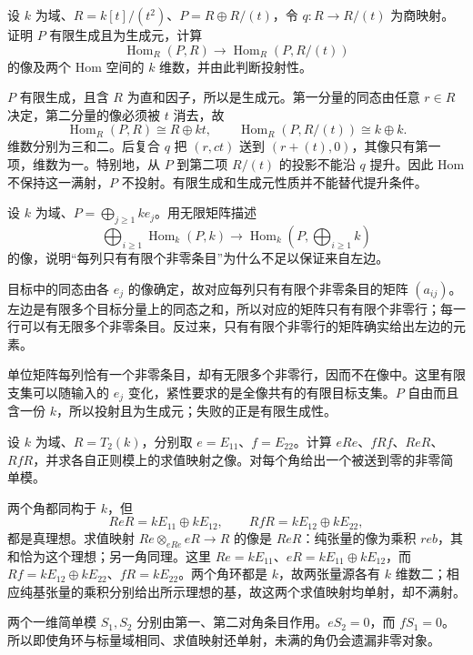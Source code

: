 \begin{exercise}\label{b2:ex:16-generator-not-projective}
	设 \(k\) 为域、\(R=k[t]/(t^2)\)、\(P=R\oplus R/(t)\)，令 \(q:R\to R/(t)\) 为商映射。证明 \(P\) 有限生成且为生成元，计算
	\[
		\operatorname{Hom}_R(P,R)\longrightarrow\operatorname{Hom}_R(P,R/(t))
	\]
	的像及两个 Hom 空间的 \(k\) 维数，并由此判断投射性。
\end{exercise}
\begin{solution}
	\(P\) 有限生成，且含 \(R\) 为直和因子，所以是生成元。第一分量的同态由任意 \(r\in R\) 决定，第二分量的像必须被 \(t\) 消去，故
	\[
		\operatorname{Hom}_R(P,R)\cong R\oplus kt,\qquad \operatorname{Hom}_R(P,R/(t))\cong k\oplus k.
	\]
	维数分别为三和二。后复合 \(q\) 把 \((r,ct)\) 送到 \((r+(t),0)\)，其像只有第一项，维数为一。特别地，从 \(P\) 到第二项 \(R/(t)\) 的投影不能沿 \(q\) 提升。因此 Hom 不保持这一满射，\(P\) 不投射。有限生成和生成元性质并不能替代提升条件。
\end{solution}

\begin{exercise}\label{b2:ex:16-projective-generator-not-compact}
	设 \(k\) 为域、\(P=\bigoplus_{j\ge1}ke_j\)。用无限矩阵描述
	\[
		\bigoplus_{i\ge1}\operatorname{Hom}_k(P,k) \longrightarrow\operatorname{Hom}_k\left(P,\bigoplus_{i\ge1}k\right)
	\]
	的像，说明“每列只有有限个非零条目”为什么不足以保证来自左边。
\end{exercise}
\begin{solution}
	目标中的同态由各 \(e_j\) 的像确定，故对应每列只有有限个非零条目的矩阵 \((a_{ij})\)。左边是有限多个目标分量上的同态之和，所以对应的矩阵只有有限个非零行；每一行可以有无限多个非零条目。反过来，只有有限个非零行的矩阵确实给出左边的元素。

	单位矩阵每列恰有一个非零条目，却有无限多个非零行，因而不在像中。这里有限支集可以随输入的 \(e_j\) 变化，紧性要求的是全像共有的有限目标支集。\(P\) 自由而且含一份 \(k\)，所以投射且为生成元；失败的正是有限生成性。
\end{solution}

\begin{exercise}\label{b2:ex:16-full-idempotent-detects}
	设 \(k\) 为域、\(R=T_2(k)\)，分别取 \(e=E_{11}\)、\(f=E_{22}\)。计算 \(eRe\)、\(fRf\)、\(ReR\)、\(RfR\)，并求各自正则模上的求值映射之像。对每个角给出一个被送到零的非零简单模。
\end{exercise}
\begin{solution}
	两个角都同构于 \(k\)，但
	\[
		ReR=kE_{11}\oplus kE_{12},\qquad RfR=kE_{12}\oplus kE_{22},
	\]
	都是真理想。求值映射 \(Re\otimes_{eRe}eR\to R\) 的像是 \(ReR\)：纯张量的像为乘积 \(reb\)，其和恰为这个理想；另一角同理。这里 \(Re=kE_{11}\)、\(eR=kE_{11}\oplus kE_{12}\)，而 \(Rf=kE_{12}\oplus kE_{22}\)、\(fR=kE_{22}\)。两个角环都是 \(k\)，故两张量源各有 \(k\) 维数二；相应纯基张量的乘积分别给出所示理想的基，故这两个求值映射均单射，却不满射。

	两个一维简单模 \(S_1,S_2\) 分别由第一、第二对角条目作用。\(eS_2=0\)，而 \(fS_1=0\)。所以即使角环与标量域相同、求值映射还单射，未满的角仍会遗漏非零对象。
\end{solution}


